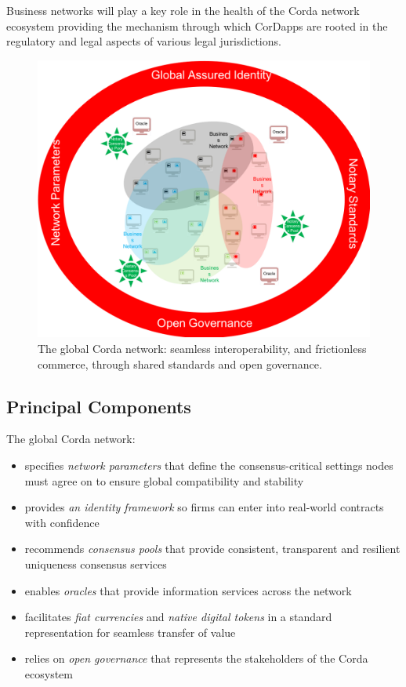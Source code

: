 \documentclass{article}
\begin{document}
Business networks will play a key role in the health of the Corda network ecosystem providing the mechanism through which CorDapps are rooted in the regulatory and legal aspects of various legal jurisdictions.

\begin{figure}[H]
    \includegraphics[scale = .5, center]{corda-connect}
    \caption{The global Corda network: seamless interoperability, and frictionless commerce, through shared standards and open governance.}
\end{figure}

\subsection{Principal Components}

The global Corda network:
\begin{itemize}
    \item specifies \textit{network parameters} that define the consensus-critical settings nodes must agree on to ensure global compatibility and stability
    \item provides \textit{an identity framework} so firms can enter into real-world contracts with confidence
    \item recommends \textit{consensus pools} that provide consistent, transparent and resilient uniqueness consensus services
    \item enables \textit{oracles} that provide information services across the network
    \item facilitates \textit{fiat currencies} and \textit{native digital tokens} in a standard representation for seamless transfer of value
    \item relies on \textit{open governance} that represents the stakeholders of the Corda ecosystem
\end{itemize}
\end{document}
